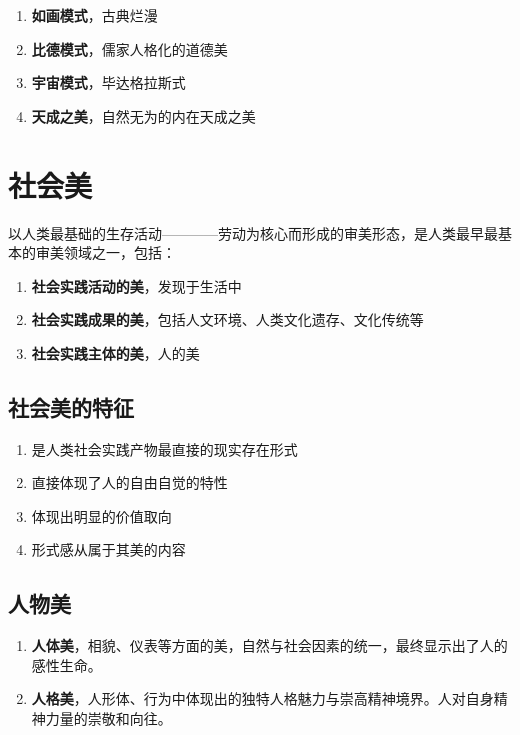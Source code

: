 \documentclass{NoteThesis/note-thesis}
\begin{document}
\begin{enumerate}
    \item \textbf{如画模式}，古典烂漫
    \item \textbf{比德模式}，儒家人格化的道德美
    \item \textbf{宇宙模式}，毕达格拉斯式
    \item \textbf{天成之美}，自然无为的内在天成之美
\end{enumerate}

\section{社会美}

以人类最基础的生存活动————劳动为核心而形成的审美形态，是人类最早最基本的审美领域之一，包括：

\begin{enumerate}
    \item \textbf{社会实践活动的美}，发现于生活中
    \item \textbf{社会实践成果的美}，包括人文环境、人类文化遗存、文化传统等
    \item \textbf{社会实践主体的美}，人的美
\end{enumerate}

\subsection{社会美的特征}

\begin{enumerate}
    \item 是人类社会实践产物最直接的现实存在形式
    \item 直接体现了人的自由自觉的特性
    \item 体现出明显的价值取向
    \item 形式感从属于其美的内容
\end{enumerate}

\subsection{\texorpdfstring{\mbox{}}{} 人物美}

\begin{enumerate}
    \item \textbf{人体美}，相貌、仪表等方面的美，自然与社会因素的统一，最终显示出了人的感性生命。
    \item \textbf{人格美}，人形体、行为中体现出的独特人格魅力与崇高精神境界。人对自身精神力量的崇敬和向往。
\end{enumerate}
\end{document}
